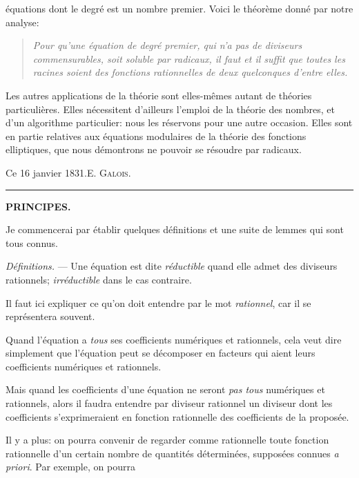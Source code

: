 
équations dont le degré est un nombre premier. Voici le théorème
donné par notre analyse:

\begin{quote}\itshape
Pour qu'une équation de degré premier, qui n'a pas de diviseurs
commensurables, soit soluble par radicaux, il faut et
il suffit que toutes les racines soient des fonctions rationnelles
de deux quelconques d'entre elles.
\end{quote}

Les autres applications de la théorie sont elles-mêmes autant
de théories particulières. Elles nécessitent d'ailleurs l'emploi de
la théorie des nombres, et d'un algorithme particulier: nous les
réservons pour une autre occasion. Elles sont en partie relatives
aux équations modulaires de la théorie des fonctions elliptiques,
que nous démontrons ne pouvoir se résoudre par radicaux.

\medskip
\noindent\hspace{3em}Ce 16 janvier 1831.\hfill \textsc{E. Galois.}\hspace{3em}

\begin{center}
\rule{0.15\linewidth}{0.4pt}\par
\vspace{0.7em}
{\bfseries PRINCIPES.}
\end{center}

Je commencerai par établir quelques définitions et une suite de
lemmes qui sont tous connus.

\emph{Définitions.} --- Une équation est dite \emph{réductible} quand elle
admet des diviseurs rationnels; \emph{irréductible} dans le cas contraire.

Il faut ici expliquer ce qu'on doit entendre par le mot \emph{rationnel},
car il se représentera souvent.

Quand l'équation a \emph{tous} ses coefficients numériques et rationnels,
cela veut dire simplement que l'équation peut se décomposer
en facteurs qui aient leurs coefficients numériques et rationnels.

Mais quand les coefficients d'une équation ne seront \emph{pas tous}
numériques et rationnels, alors il faudra entendre par diviseur
rationnel un diviseur dont les coefficients s'exprimeraient en
fonction rationnelle des coefficients de la proposée.

Il y a plus: on pourra convenir de regarder comme rationnelle
toute fonction rationnelle d'un certain nombre de quantités déterminées,
supposées connues \emph{a priori}. Par exemple, on pourra
